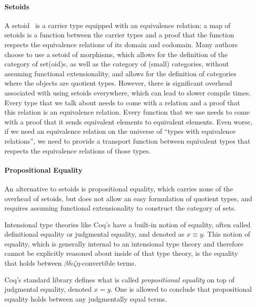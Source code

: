 \paragraph{Setoids}
A setoid~\cite{bishop1967foundations} is a carrier type equipped with an equivalence relation; a map of setoids is a function between the carrier types and a proof that the function respects the equivalence relations of its domain and codomain.
Many authors \cite{copumpkin/categories,MathClasses,megacz-coq-categories,huet2000constructive,benediktahrens/coinductives,ahrens2010categorical,konn/category-agda,Algebra,mattam82-cat,Carvalho1998,wilander2012constructing%
}
choose to use a setoid of morphisms, which allows for the definition of the category of set(oid)s, as well as the category of (small) categories, without assuming functional extensionality, and allows for the definition of categories where the objects are quotient types.
However, there is significant overhead associated with using setoids everywhere, which can lead to slower compile times.
Every type that we talk about needs to come with a relation and a proof that this relation is an equivalence relation.
Every function that we use needs to come with a proof that it sends equivalent elements to equivalent elements.
Even worse, if we need an equivalence relation on the universe of ``types with equivalence relations'', we need to provide a transport function between equivalent types that respects the equivalence relations of those types.

\paragraph{Propositional Equality}
An alternative to setoids is propositional equality, which carries none of the overhead of setoids, but does not allow an easy formulation of quotient types, and requires assuming functional extensionality to construct the category of sets.

Intensional type theories like Coq's have a built-in notion of equality, often called definitional equality or judgmental equality, and denoted as $x \equiv y$.
This notion of equality, which is generally internal to an intensional type theory and therefore cannot be explicitly reasoned about inside of that type theory, is the equality that holds between $\beta\delta\iota\zeta\eta$-convertible terms.

Coq's standard library defines what is called \emph{propositional equality} on top of judgmental equality, denoted $x = y$.
One is allowed to conclude that propositional equality holds between any judgmentally equal terms.

